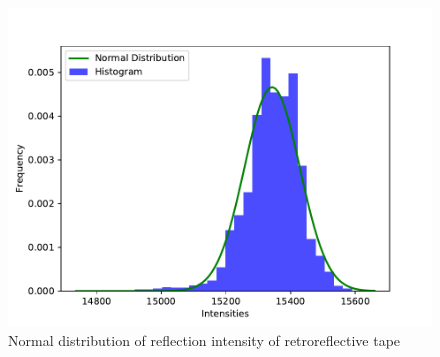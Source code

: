   \begin{figure}[h]
    \centering
    \includegraphics[keepaspectratio, scale=0.50] {images/pdf/RobotGuidance_plot_reflection_intensities_of_tape}
    \captionsetup{justification=raggedright} %
    \caption{Normal distribution of reflection intensity of retroreflective tape}
    \label{Fig:Normal distribution of reflection intensity of retroreflective tape}
  \end{figure}

\newpage